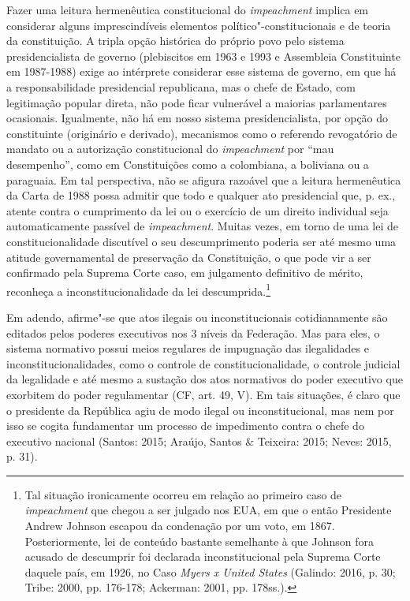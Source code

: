 Fazer uma leitura hermenêutica constitucional do \emph{impeachment}
implica em considerar alguns imprescindíveis elementos
político"-constitucionais e de teoria da constituição. A tripla opção
histórica do próprio povo pelo sistema presidencialista de governo
(plebiscitos em 1963 e 1993 e Assembleia Constituinte em 1987-1988)
exige ao intérprete considerar esse sistema de governo, em que há a
responsabilidade presidencial republicana, mas o chefe de Estado, com
legitimação popular direta, não pode ficar vulnerável a maiorias
parlamentares ocasionais. Igualmente, não há em nosso sistema
presidencialista, por opção do constituinte (originário e derivado),
mecanismos como o referendo revogatório de mandato ou a autorização
constitucional do \emph{impeachment} por ``mau desempenho'', como em
Constituições como a colombiana, a boliviana ou a paraguaia. Em tal
perspectiva, não se afigura razoável que a leitura hermenêutica da Carta
de 1988 possa admitir que todo e qualquer ato presidencial que, p. ex.,
atente contra o cumprimento da lei ou o exercício de um direito
individual seja automaticamente passível de \emph{impeachment}. Muitas
vezes, em torno de uma lei de constitucionalidade discutível o seu
descumprimento poderia ser até mesmo uma atitude governamental de
preservação da Constituição, o que pode vir a ser confirmado pela
Suprema Corte caso, em julgamento definitivo de mérito, reconheça a
inconstitucionalidade da lei descumprida.\footnote{Tal situação
  ironicamente ocorreu em relação ao primeiro caso de \emph{impeachment}
  que chegou a ser julgado nos EUA, em que o então Presidente Andrew
  Johnson escapou da condenação por um voto, em 1867. Posteriormente,
  lei de conteúdo bastante semelhante à que Johnson fora acusado de
  descumprir foi declarada inconstitucional pela Suprema Corte daquele
  país, em 1926, no Caso \emph{Myers x United States} (Galindo: 2016, p.
  30; Tribe: 2000, pp. 176-178; Ackerman: 2001, pp. 178ss.).}

Em adendo, afirme"-se que atos ilegais ou inconstitucionais
cotidianamente são editados pelos poderes executivos nos 3 níveis da
Federação. Mas para eles, o sistema normativo possui meios regulares de
impugnação das ilegalidades e inconstitucionalidades, como o controle de
constitucionalidade, o controle judicial da legalidade e até mesmo a
sustação dos atos normativos do poder executivo que exorbitem do poder
regulamentar (CF, art. 49, V). Em tais situações, é claro que o
presidente da República agiu de modo ilegal ou inconstitucional, mas nem
por isso se cogita fundamentar um processo de impedimento contra o chefe
do executivo nacional (Santos: 2015; Araújo, Santos \& Teixeira: 2015;
Neves: 2015, p. 31).

